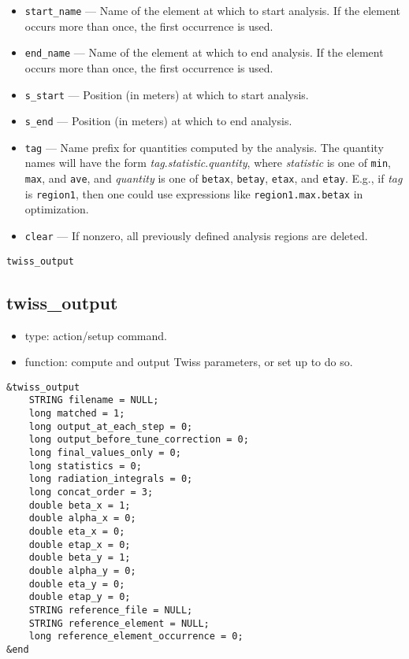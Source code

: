 \documentclass[11pt]{article}
\begin{document}
\begin{itemize}
\item \verb|start_name| --- Name of the element at which to start analysis.  If the
        element occurs more than once, the first occurrence is used.
\item \verb|end_name| --- Name of the element at which to end analysis.  If the
        element occurs more than once, the first occurrence is used.
\item \verb|s_start| --- Position (in meters) at which to start analysis.
\item \verb|s_end| --- Position (in meters) at which to end analysis.
\item \verb|tag| --- Name prefix for quantities computed by the analysis.  The quantity
        names will have the form {\em tag}.{\em statistic}.{\em quantity}, where {\em statistic}
        is one of \verb|min|, \verb|max|, and \verb|ave|, and {\em quantity} is one of
        \verb|betax|, \verb|betay|, \verb|etax|, and \verb|etay|.  E.g., if {\em tag} is \verb|region1|,
        then one could use expressions like \verb|region1.max.betax| in optimization.
\item \verb|clear| --- If nonzero, all previously defined analysis regions are deleted.
\end{itemize}

\begin{latexonly}
\newpage
\begin{center}{\Large\verb|twiss_output|}\end{center}
\end{latexonly}
\subsection{twiss\_output}

\begin{itemize}
\item type: action/setup command.
\item function: compute and output Twiss parameters, or set up to do so.
\end{itemize}

\begin{verbatim}
&twiss_output
    STRING filename = NULL;
    long matched = 1;
    long output_at_each_step = 0;
    long output_before_tune_correction = 0;
    long final_values_only = 0;
    long statistics = 0;
    long radiation_integrals = 0;
    long concat_order = 3;
    double beta_x = 1;
    double alpha_x = 0;
    double eta_x = 0;
    double etap_x = 0;
    double beta_y = 1;
    double alpha_y = 0;
    double eta_y = 0;
    double etap_y = 0;
    STRING reference_file = NULL;
    STRING reference_element = NULL;
    long reference_element_occurrence = 0;
&end
\end{verbatim}
\end{document}
